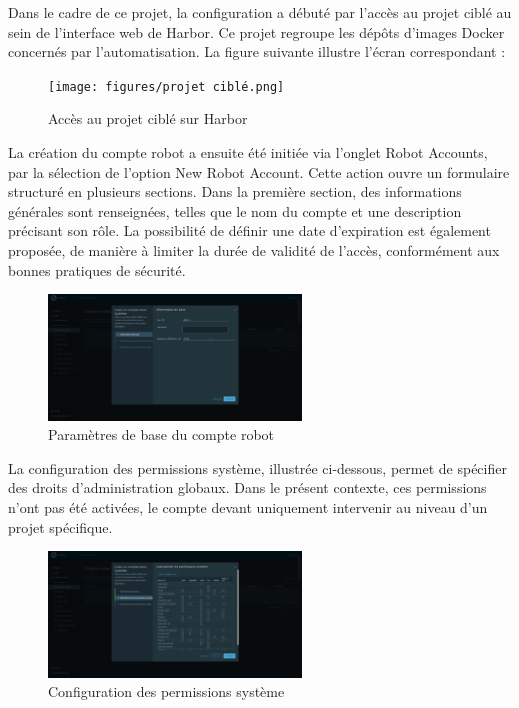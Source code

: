 Dans le cadre de ce projet, la configuration a débuté par l’accès au projet ciblé au sein de l’interface web de Harbor. Ce projet regroupe les dépôts d’images Docker concernés par l’automatisation. La figure suivante illustre l’écran correspondant :

\begin{figure}[H]
	\centering
	\texttt{[image: figures/projet ciblé.png]}
	\caption{Accès au projet ciblé sur Harbor}
\end{figure}

La création du compte robot a ensuite été initiée via l’onglet Robot Accounts, par la sélection de l’option New Robot Account. Cette action ouvre un formulaire structuré en plusieurs sections. Dans la première section, des informations générales sont renseignées, telles que le nom du compte et une description précisant son rôle. La possibilité de définir une date d’expiration est également proposée, de manière à limiter la durée de validité de l’accès, conformément aux bonnes pratiques de sécurité.

\begin{figure}[H]
	\centering
	\includegraphics[width=0.6\textwidth]{figures/harbor robot account informations de base.png}
	\caption{Paramètres de base du compte robot}
\end{figure}

La configuration des permissions système, illustrée ci-dessous, permet de spécifier des droits d’administration globaux. Dans le présent contexte, ces permissions n’ont pas été activées, le compte devant uniquement intervenir au niveau d’un projet spécifique.

\begin{figure}[H]
	\centering
	\includegraphics[width=0.6\textwidth]{figures/harbor robot account permissions systeme.png}
	\caption{Configuration des permissions système}
\end{figure}

